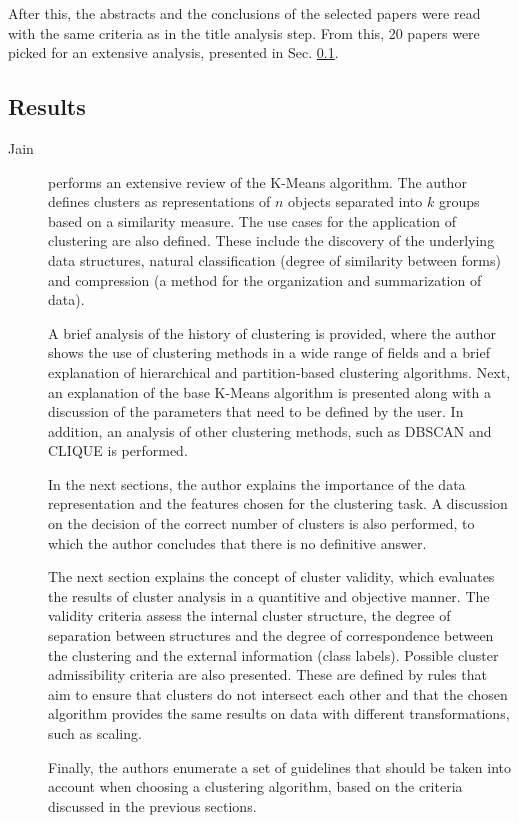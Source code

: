 After this, the abstracts and the conclusions of the selected papers were read with the same criteria as in the title analysis step. From this, 20 papers were picked for an extensive analysis, presented in Sec. \ref{sec:clustering_sota_results}.


\subsection{Results}\label{sec:clustering_sota_results}
\begin{description}
    \item[Jain]\cite{Jain_Dataclustering50_2010} performs an extensive review of the K-Means algorithm. The author defines clusters as representations of $n$ objects separated into $k$ groups based on a similarity measure. The use cases for the application of clustering are also defined. These include the discovery of the underlying data structures, natural classification (degree of similarity between forms) and compression (a method for the organization and summarization of data).
    
    A brief analysis of the history of clustering is provided, where the author shows the use of clustering methods in a wide range of fields and a brief explanation of hierarchical and partition-based clustering algorithms. Next, an explanation of the base K-Means algorithm is presented along with a discussion of the parameters that need to be defined by the user. In addition, an analysis of other clustering methods, such as DBSCAN and CLIQUE is performed. 

    In the next sections, the author explains the importance of the data representation and the features chosen for the clustering task. A discussion on the decision of the correct number of clusters is also performed, to which the author concludes that there is no definitive answer.

    The next section explains the concept of cluster validity, which evaluates the results of cluster analysis in a quantitive and objective manner. The validity criteria assess the internal cluster structure, the degree of separation between structures and the degree of correspondence between the clustering and the external information (class labels). Possible cluster admissibility criteria are also presented. These are defined by rules that aim to ensure that clusters do not intersect each other and that the chosen algorithm provides the same results on data with different transformations, such as scaling.
    
    Finally, the authors enumerate a set of guidelines that should be taken into account when choosing a clustering algorithm, based on the criteria discussed in the previous sections.
\end{description}

